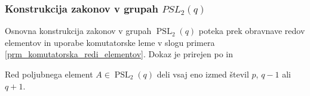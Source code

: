 
    \subsubsection{Konstrukcija zakonov v grupah $PSL_2(q)$}

    Osnovna konstrukcija zakonov v grupah $\operatorname{PSL}_2(q)$ poteka prek obravnave redov elementov in uporabe komutatorske leme v slogu primera \ref{prm_komutatorska_redi_elementov}.
    Dokaz je prirejen po \cite[str.~36--37]{Schneider_2016} in %
    \begin{lema}
    \label{lem_redi_elementov_v_psl2q}
    Red poljubnega element $A \in  \operatorname{PSL}_2(q)$ deli vsaj eno izmed števil $p$, $q-1$ ali $q + 1$. 
    \end{lema}
